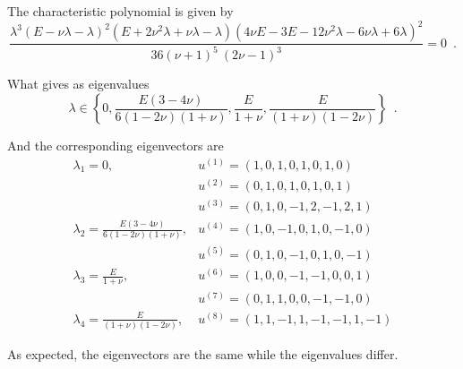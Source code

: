 The characteristic polynomial is given by
\begin{equation}
  \frac{\lambda^3 (E - \nu\lambda - \lambda)^2(E + 2\nu^2\lambda + \nu\lambda - \lambda)(4\nu E - 3E - 12\nu^2\lambda - 6\nu\lambda + 6\lambda)^2}{36(\nu + 1)^5\ (2\nu - 1)^3}=0 \enspace .
\end{equation}

What gives as eigenvalues
\[\lambda \in \left\{0,
	\frac{E(3 - 4\nu)}{6(1 - 2\nu)(1 + \nu)},
	\frac{E}{1 + \nu},
	\frac{E}{(1 + \nu)(1 - 2\nu)} \right\} \enspace .
\]

And the corresponding eigenvectors are
\begin{equation}
\begin{array}{ll}
\lambda_1 = 0, 
	&u^{(1)} = (1, 0, 1, 0, 1, 0, 1, 0)\\
	&u^{(2)} = (0, 1, 0, 1, 0, 1, 0, 1)\\
	&u^{(3)} = (0, 1, 0, -1, 2, -1, 2, 1)\\
\lambda_2 = \frac{E(3 - 4\nu)}{6(1 - 2\nu)(1 + \nu)}, 
	&u^{(4)} = (1, 0, -1, 0, 1, 0, -1, 0)\\
	&u^{(5)} = (0, 1, 0, -1, 0, 1, 0, -1)\\
\lambda_3 = \frac{E}{1 + \nu}, 
	&u^{(6)} = (1, 0, 0, -1, -1, 0, 0, 1)\\
	&u^{(7)} = (0, 1, 1, 0, 0, -1, -1, 0)\\
\lambda_4 = \frac{E}{(1 + \nu)(1 - 2\nu)}, 
	&u^{(8)} = (1, 1, -1, 1, -1, -1, 1, -1)
\end{array}
\end{equation}

As expected, the eigenvectors are the same while the eigenvalues differ.


